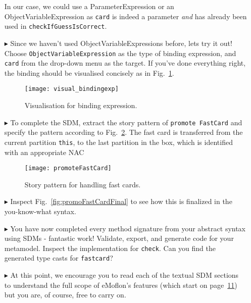 \begin{itemize}
In our case, we could use a ParameterExpression or an ObjectVariableExpression as \texttt{card} is indeed a parameter \emph{and} has already been used in
\texttt{checkIfGuessIsCorrect}. 

\item[$\blacktriangleright$] Since we haven't used ObjectVariableExpressions before, lets try it out! Choose \texttt{ObjectVariableExpression} as the type of
binding expression, and \texttt{card} from the drop-down menu as the target. If you've done everything right, the binding should be visualised concisely as in
Fig.~\ref{fig:sdm_fastcard_4}.
 
\begin{figure}[htbp]
\begin{center}
  \texttt{[image: visual\_bindingexp]}
  \caption{Visualisation for binding expression.}  
  \label{fig:sdm_fastcard_4}
\end{center}
\end{figure}

\item[$\blacktriangleright$] To complete the SDM, extract the story pattern of \texttt{promote FastCard} and specify the pattern according to
Fig.~\ref{fig:sdm_fastcard_5}.
The fast card is transferred from the current partition \texttt{this}, to the last partition in the box, which is identified with an appropriate \mbox{NAC}

\begin{figure}[htbp]
\begin{center}
  \texttt{[image: promoteFastCard]}
  \caption{Story pattern for handling fast cards.}  
  \label{fig:sdm_fastcard_5}
\end{center}
\end{figure}

\item[$\blacktriangleright$] Inspect Fig.~\ref{fig:promoFastCardFinal} to see how this is finalized in the you-know-what syntax.

\item[$\blacktriangleright$] You have now completed every method signature from your abstract syntax using SDMs - fantastic work! Validate, export, and generate
code for your metamodel. Inspect the implementation for \texttt{check}.  Can you find the generated type casts for \texttt{fastcard}?

\item[$\blacktriangleright$] At this point, we encourage you to read each of the textual SDM sections to understand the full scope of eMoflon's features
(which start on page~\hyperlink{page.11}{11}) but you are, of course, free to carry on.


\end{itemize}

